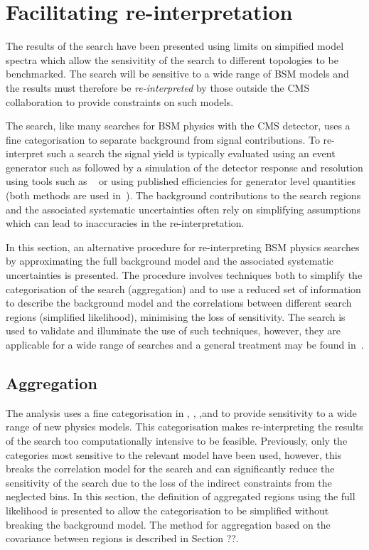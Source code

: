 \chapter{Facilitating re-interpretation} %
The results of the \alphat search have been presented using limits on simpified model
spectra which allow the sensivitity of the search to different topologies 
to be benchmarked. The search will be sensitive to a wide range of BSM models
and the results must therefore be \emph{re-interpreted} by those outside the 
CMS collaboration to provide constraints on such models.

The \alphat search, like many searches for BSM physics with the CMS detector, uses a 
fine categorisation to separate background from signal contributions. To re-interpret
such a search the signal yield is typically evaluated using an event generator such as \PYTHIA 
followed by a simulation of the detector response and resolution using tools 
such as \DELPHES~\cite{delphes} or using published efficiencies for generator
level quantities (both methods are used in~\cite{Drees:2013wra,Papucci:2014rja,mastercode}).
The background contributions to the search regions and the associated systematic uncertainties often rely
on simplifying assumptions which can lead to inaccuracies in the re-interpretation. 

In this section, an alternative procedure for re-interpreting BSM physics searches by approximating
the full background model and the associated systematic uncertainties is presented. 
The procedure involves techniques both to simplify the categorisation of the search (aggregation)
and to use a reduced set of information to describe the background model 
and the correlations between different search regions (simplified likelihood),
minimising the loss of sensitivity. The \alphat search is used to validate and illuminate
the use of such techniques, however, they are applicable for a wide range of 
searches and a general treatment may be found in~\cite{simp-lik}.

\section{Aggregation}%
\label{sec:agg-reg}
The \alphat analysis uses a fine categorisation in \njet, \nb, \scalht,and \mht to provide
sensitivity to a wide range of new physics models. This categorisation makes re-interpreting
the results of the search too computationally intensive to be feasible. Previously, 
only the categories most sensitive to the relevant model have been used, however,
this breaks the correlation model for the search and can significantly reduce
the sensitivity of the search due to the loss of the indirect constraints from
the neglected bins. In this section, the definition of aggregated regions 
using the full likelihood is presented to allow the categorisation to be 
simplified without breaking the background model. The method for aggregation based
on the covariance between regions is described in Section ??.

